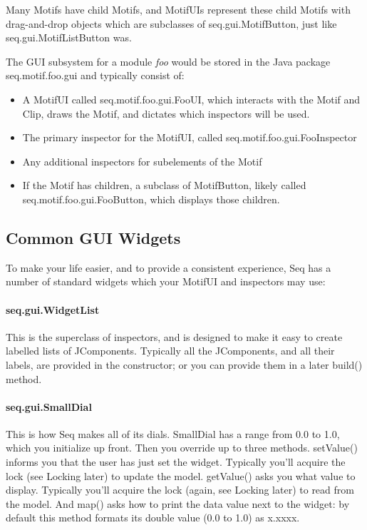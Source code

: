 \documentclass[twoside,10pt]{article}
\begin{document}
Many Motifs have child Motifs, and MotifUIs represent these child Motifs with drag-and-drop objects which are subclasses of {\sf seq.gui.MotifButton}, just like {\sf seq.gui.MotifListButton} was.

The GUI subsystem for a module {\it foo} would be stored in the Java package {\sf seq.motif.foo.gui} and typically consist of:

\begin{itemize}
\item A MotifUI called {\sf seq.motif.foo.gui.FooUI}, which interacts with the Motif and Clip, draws the Motif, and dictates which inspectors will be used.
\item The primary inspector for the MotifUI, called {\sf seq.motif.foo.gui.FooInspector}
\item Any additional inspectors for subelements of the Motif
\item If the Motif has children, a subclass of MotifButton, likely called {\sf seq.motif.foo.gui.FooButton}, which displays those children.
\end{itemize}

\subsection{Common GUI Widgets}

To make your life easier, and to provide a consistent experience, Seq has a number of standard widgets which your MotifUI and inspectors may use:

\paragraph{seq.gui.WidgetList}  This is the superclass of inspectors, and is designed to make it easy to create labelled lists of JComponents.  Typically all the JComponents, and all their labels, are provided in the constructor; or you can provide them in a later {\sf build()} method.

\paragraph{seq.gui.SmallDial}  This is how Seq makes all of its dials.  SmallDial has a range from 0.0 to 1.0, which you initialize up front.  Then you override up to three methods.  {\sf setValue()} informs you that the user has just set the widget.  Typically you'll acquire the lock (see Locking later) to update the model.  {\sf getValue()} asks you what value to display.  Typically you'll acquire the lock (again, see Locking later) to read from the model.  And {\sf map()} asks how to print the data value next to the widget: by default this method formats its double value (0.0 to 1.0) as x.xxxx.
\end{document}

